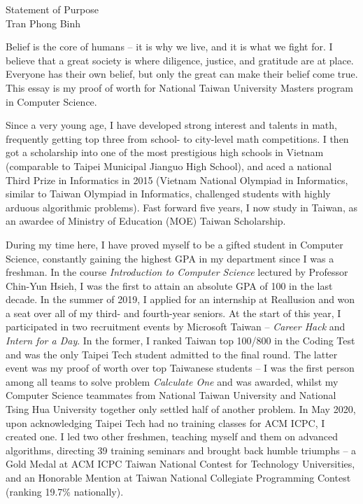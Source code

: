 \documentclass[letterpaper,12pt]{article}
\begin{document}
\begin{center}
{\Large Statement of Purpose} \\[.3in]
{\large Tran Phong Binh}
\end{center}

\vspace*{.5in}

Belief is the core of humans -- it is why we live, and it is what we fight for. I believe that a great society is where diligence, justice, and gratitude are at place.  Everyone has their own belief, but only the great can make their belief come true. This essay is my proof of worth for National Taiwan University Masters program in Computer Science.

Since a very young age, I have developed strong interest and talents in math, frequently getting top three from school- to city-level math competitions. I then got a scholarship into one of the most prestigious high schools in Vietnam (comparable to Taipei Municipal Jianguo High School), and aced a national Third Prize in Informatics in 2015 (Vietnam National Olympiad in Informatics, similar to Taiwan Olympiad in Informatics, challenged students with highly arduous algorithmic problems). Fast forward five years, I now study in Taiwan, as an awardee of Ministry of Education (MOE) Taiwan Scholarship.

During my time here, I have proved myself to be a gifted student in Computer Science, constantly gaining the highest GPA in my department since I was a freshman. In the course \textit{Introduction to Computer Science} lectured by Professor Chin-Yun Hsieh, I was the first to attain an absolute GPA of 100 in the last decade. In the summer of 2019, I applied for an internship at Reallusion and won a seat over all of my third- and fourth-year seniors. At the start of this year, I participated in two recruitment events by Microsoft Taiwan -- \textit{Career Hack} and \textit{Intern for a Day}. In the former, I ranked Taiwan top 100/800 in the Coding Test and was the only Taipei Tech student admitted to the final round. The latter event was my proof of worth over top Taiwanese students -- I was the first person among all teams to solve problem \textit{Calculate One} and was awarded, whilst my Computer Science teammates from National Taiwan University and National Tsing Hua University together only settled half of another problem. In May 2020, upon acknowledging Taipei Tech had no training classes for ACM ICPC, I created one. I led two other freshmen, teaching myself and them on advanced algorithms, directing 39 training seminars and brought back humble triumphs -- a Gold Medal at ACM ICPC Taiwan National Contest for Technology Universities, and an Honorable Mention at Taiwan National Collegiate Programming Contest (ranking 19.7\% nationally).
\end{document}
